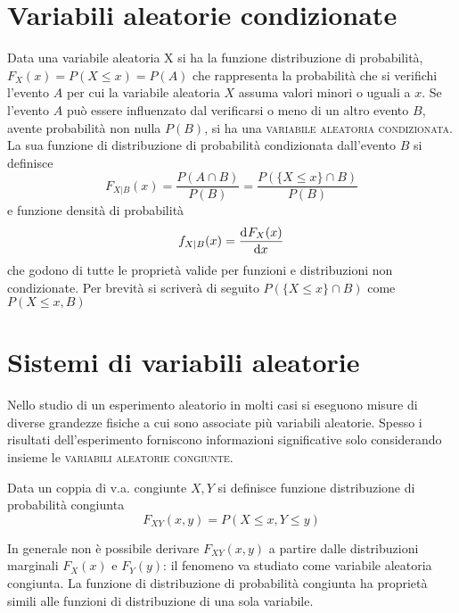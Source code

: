 \section{Variabili aleatorie condizionate}
Data una variabile aleatoria X si ha la funzione distribuzione di probabilità, $F_X(x)=P(X\leq x)=P(A)$ che rappresenta la probabilità che si verifichi l'evento $A$ per cui la variabile aleatoria $X$ assuma valori minori o uguali a $x$.
Se l'evento $A$ può essere influenzato dal verificarsi o meno di un altro evento $B$, avente probabilità non nulla $P(B)$, si ha una \textsc{variabile aleatoria condizionata}.
La sua funzione di distribuzione di probabilità condizionata dall'evento $B$ si definisce
\begin{equation}
F_{X|B}(x)=\frac{P(A\cap B)}{P(B)}=\frac{P(\lbrace X\leq x\rbrace\cap B)}{P(B)}
\end{equation}
e funzione densità di probabilità
\[f_{X|B}(x)=\dfrac{\mathop{}\!\mathrm{d}^{}F_X(x)}{\mathop{}\!\mathrm{d} x^{}}\]
che godono di tutte le proprietà valide per funzioni e distribuzioni non condizionate.
Per brevità si scriverà di seguito $P(\lbrace X\leq x\rbrace\cap B)$ come $P(X\leq x, B)$

\section{Sistemi di variabili aleatorie}
Nello studio di un esperimento aleatorio in molti casi si eseguono misure di diverse grandezze fisiche a cui sono associate più variabili aleatorie. Spesso i risultati dell'esperimento forniscono informazioni significative solo considerando insieme le \textsc{variabili aleatorie congiunte}.

Data un coppia di v.a. congiunte $X,Y$ si definisce funzione distribuzione di probabilità congiunta
\begin{equation}
F_{XY}(x,y)=P(X\leq x,Y\leq y)
\end{equation}\label{eq:funz_dist_prob_congiunta}

In generale non è possibile derivare $F_{XY}(x,y)$ a partire dalle distribuzioni marginali $F_X(x)$ e $F_Y(y)$: il fenomeno va studiato come variabile aleatoria congiunta.
La funzione di distribuzione di probabilità congiunta ha proprietà simili alle funzioni di distribuzione di una sola variabile.\\

